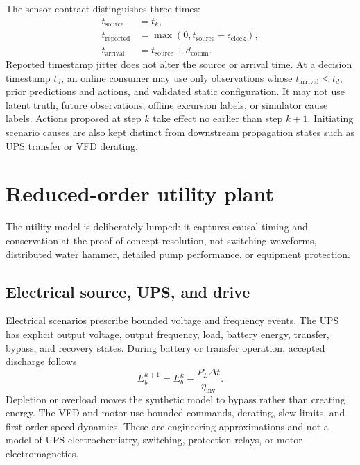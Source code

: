 \documentclass[10pt,twocolumn]{article}
\begin{document}
The sensor contract distinguishes three times:
\begin{equation}
\begin{aligned}
 t_{\mathrm{source}}&=t_k,\\
 t_{\mathrm{reported}}&=\max(0,t_{\mathrm{source}}
 +\epsilon_{\mathrm{clock}}),\\
 t_{\mathrm{arrival}}&=t_{\mathrm{source}}+d_{\mathrm{comm}}.
\end{aligned}
 \label{eq:clocks}
\end{equation}
Reported timestamp jitter does not alter the source or arrival time. At a
decision timestamp $t_d$, an online consumer may use only observations whose
$t_{\mathrm{arrival}}\leq t_d$, prior predictions and actions, and validated
static configuration. It may not use latent truth, future observations,
offline excursion labels, or simulator cause labels. Actions proposed at step
$k$ take effect no earlier than step $k+1$. Initiating scenario causes are
also kept distinct from downstream propagation states such as UPS transfer or
VFD derating.

\section{Reduced-order utility plant}

The utility model is deliberately lumped: it captures causal timing and
conservation at the proof-of-concept resolution, not switching waveforms,
distributed water hammer, detailed pump performance, or equipment protection.

\subsection{Electrical source, UPS, and drive}

Electrical scenarios prescribe bounded voltage and frequency events. The UPS
has explicit output voltage, output frequency, load, battery energy, transfer,
bypass, and recovery states. During battery or transfer operation, accepted
discharge follows
\begin{equation}
 E_b^{k+1}=E_b^k-\frac{P_L\Delta t}{\eta_{\mathrm{inv}}}.
 \label{eq:ups-energy}
\end{equation}
Depletion or overload moves the synthetic model to bypass rather than creating
energy. The VFD and motor use bounded commands, derating, slew limits, and
first-order speed dynamics. These are engineering approximations and not a
model of UPS electrochemistry, switching, protection relays, or motor
electromagnetics.
\end{document}
